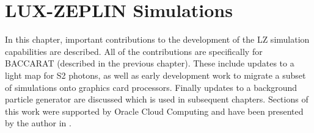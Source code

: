 \chapter{LUX-ZEPLIN Simulations}
\label{chap:lz_simulations}
\par
In this chapter, important contributions to the development of the LZ simulation capabilities are described.
All of the contributions are specifically for BACCARAT (described in the previous chapter).
These include updates to a light map for S2 photons, as well as early development work to migrate a subset of simulations onto graphics card processors.
Finally updates to a background particle generator are discussed which is used in subsequent chapters.
Sections of this work were supported by Oracle Cloud Computing and have been presented by the author in \cite{se_poster_2018,se_poster_2019_summerschool,se_poster_2019_bristol,SEriksen_IoP_2021_talk_ref}.





